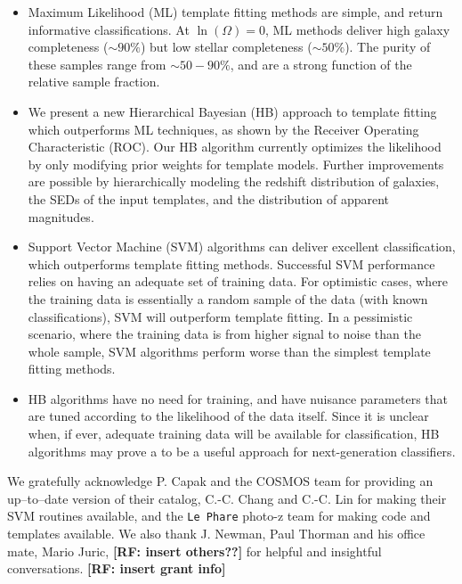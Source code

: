 \documentclass[12pt,preprint]{aastex}
\newcommand\rf[1]{{\bf [RF: #1]}}
\begin{document}
\begin{itemize}

\item Maximum Likelihood (ML) template fitting methods are simple, and
  return informative classifications.  At $\ln(\Omega)=0$, ML methods
  deliver high galaxy completeness ($\sim90\%$) but low stellar
  completeness ($\sim50\%$).  The purity of these samples range from
  $\sim50-90\%$, and are a strong function of the relative sample
  fraction.

\item We present a new Hierarchical Bayesian (HB) approach to template
  fitting which outperforms ML techniques, as shown by the Receiver
  Operating Characteristic (ROC).  Our HB algorithm currently
  optimizes the likelihood by only modifying prior weights for
  template models.  Further improvements are possible by
  hierarchically modeling the redshift distribution of galaxies, the
  SEDs of the input templates, and the distribution of apparent
  magnitudes.

\item Support Vector Machine (SVM) algorithms can deliver excellent
  classification, which outperforms template fitting methods.
  Successful SVM performance relies on having an adequate set of
  training data.  For optimistic cases, where the training data is
  essentially a random sample of the data (with known
  classifications), SVM will outperform template fitting.  In a
  pessimistic scenario, where the training data is from higher signal
  to noise than the whole sample, SVM algorithms perform worse than
  the simplest template fitting methods.

\item HB algorithms have no need for training, and have nuisance
  parameters that are tuned according to the likelihood of the data
  itself.  Since it is unclear when, if ever, adequate training data
  will be available for classification, HB algorithms may prove a to
  be a useful approach for next-generation classifiers.

\end{itemize}

\acknowledgments

We gratefully acknowledge P. Capak and the COSMOS team for providing
an up--to--date version of their catalog, C.-C. Chang and C.-C. Lin
for making their SVM routines available, and the {\tt Le Phare}
photo-z team for making code and templates available.  We also thank
J. Newman, Paul Thorman and his office mate, Mario Juric, \rf{insert others??} for helpful and insightful
conversations.  \rf{insert grant info}
\end{document}
